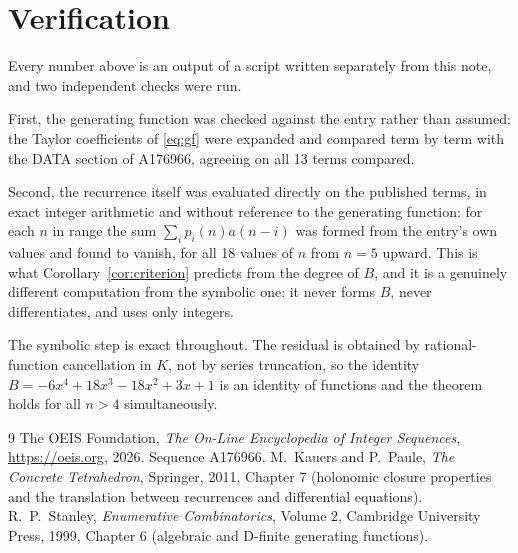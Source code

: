 \documentclass[11pt,a4paper]{article}
\theoremstyle{plain}
\theoremstyle{definition}
\begin{document}
\section{Verification}

Every number above is an output of a script written separately from this note, and two
independent checks were run.

First, the generating function was checked against the entry rather than assumed: the
Taylor coefficients of \eqref{eq:gf} were expanded and compared term by term with the DATA
section of A176966, agreeing on all 13 terms compared.

Second, the recurrence itself was evaluated directly on the published terms, in exact
integer arithmetic and without reference to the generating function: for each $n$ in range
the sum $\sum_{i}p_{i}(n)a(n-i)$ was formed from the entry's own values and found to
vanish, for all 18 values of $n$ from $n=5$ upward. This is what
Corollary~\ref{cor:criterion} predicts from the degree of $B$, and it is a genuinely
different computation from the symbolic one: it never forms $B$, never differentiates, and
uses only integers.

The symbolic step is exact throughout. The residual is obtained by rational-function
cancellation in $K$, not by series truncation, so the identity $B=- 6 x^{4} + 18 x^{3} - 18 x^{2} + 3 x + 1$ is an
identity of functions and the theorem holds for all $n>4$ simultaneously.

\begin{thebibliography}{9}
 The OEIS Foundation, \emph{The On-Line Encyclopedia of Integer Sequences},
\url{https://oeis.org}, 2026. Sequence A176966.
 M.~Kauers and P.~Paule, \emph{The Concrete Tetrahedron}, Springer, 2011,
Chapter 7 (holonomic closure properties and the translation between recurrences and
differential equations).
 R.~P.~Stanley, \emph{Enumerative Combinatorics}, Volume 2, Cambridge
University Press, 1999, Chapter 6 (algebraic and D-finite generating functions).
\end{thebibliography}
\end{document}
